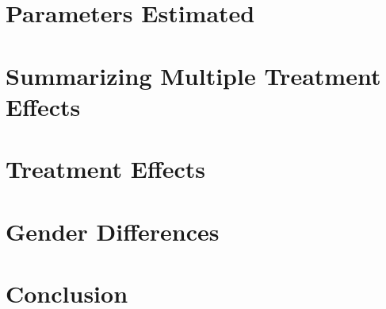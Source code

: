 \section{Parameters Estimated}
\label{sec:parameters}


\section{Summarizing Multiple Treatment Effects}
\label{sec:combining-functions}


\section{Treatment Effects}
\label{sec:treatment-effects}


\section{Gender Differences}
\label{sec:gender-differences}


\section{Conclusion}
\label{sec:conclusion}


\clearpage
\singlespacing




